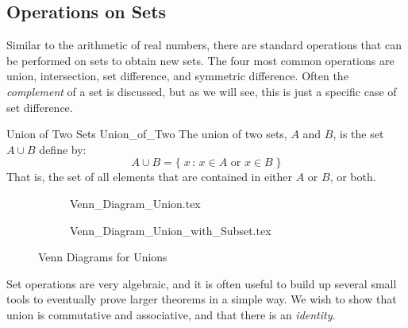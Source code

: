 \documentclass[crop=false,class=book,oneside]{standalone}
\begin{document}
        \subsection{Operations on Sets}
            Similar to the arithmetic of real numbers, there
            are standard operations that can be performed on
            sets to obtain new sets. The four most common
            operations are union, intersection, set difference,
            and symmetric difference. Often the
            \textit{complement} of a set is discussed, but as
            we will see, this is just a specific case of set
            difference.
            \begin{ldefinition}{Union of Two Sets}
                  {Union_of_Two}
                The union of two sets, $A$ and $B$, is the set
                $A\cup{B}$ define by:
                \begin{equation}
                    A\cup{B}=
                    \{\;x\,:\,x\in{A}\textrm{ or }x\in{B}\;\}
                \end{equation}
                That is, the set of all elements that are
                contained in either $A$ or $B$, or both.
            \end{ldefinition}
            \begin{figure}[H]
                \centering
                \begin{subfigure}[b]{0.49\textwidth}
                    \centering
                    
                        {Venn_Diagram_Union.tex}
                \end{subfigure}
                \begin{subfigure}[b]{0.49\textwidth}
                    \centering
                    
                        {Venn_Diagram_Union_with_Subset.tex}
                \end{subfigure}
                \caption{Venn Diagrams for Unions}
                \label{fig:Venn_Diagram_Union_With_Subset}
            \end{figure}
            Set operations are very algebraic, and it is often
            useful to build up several small tools to eventually
            prove larger theorems in a simple way. We wish to
            show that union is commutative and associative, and
            that there is an \textit{identity}.
\end{document}
